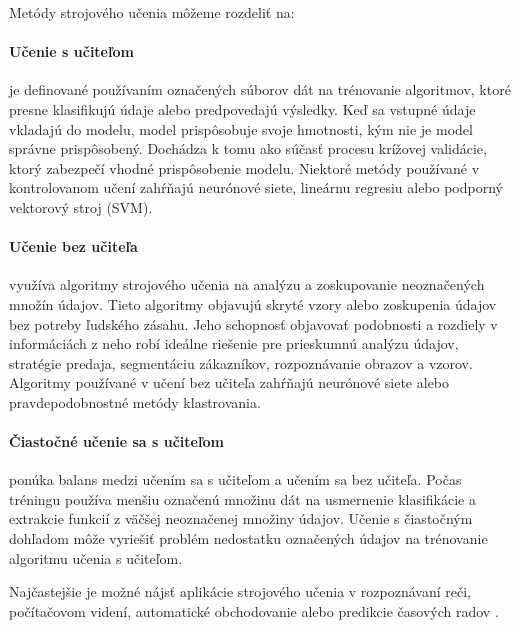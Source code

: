 Metódy strojového učenia môžeme rozdeliť na:
\paragraph{Učenie s učiteľom} je definované používaním označených súborov dát na trénovanie algoritmov, ktoré presne klasifikujú údaje alebo predpovedajú výsledky. Keď sa vstupné údaje vkladajú do modelu, model prispôsobuje svoje hmotnosti, kým nie je model správne prispôsobený. Dochádza k tomu ako súčasť procesu krížovej validácie, ktorý zabezpečí vhodné prispôsobenie modelu. Niektoré metódy používané v kontrolovanom učení zahŕňajú neurónové siete, lineárnu regresiu alebo podporný vektorový stroj (SVM).

\paragraph{Učenie bez učiteľa} využíva algoritmy strojového učenia na analýzu a zoskupovanie neoznačených množín údajov. Tieto algoritmy objavujú skryté vzory alebo zoskupenia údajov bez potreby ľudského zásahu. Jeho schopnosť objavovať podobnosti a rozdiely v informáciách z neho robí ideálne riešenie pre prieskumnú analýzu údajov, stratégie predaja, segmentáciu zákazníkov, rozpoznávanie obrazov a vzorov. Algoritmy používané v učení bez učiteľa zahŕňajú neurónové siete alebo pravdepodobnostné metódy klastrovania.

\paragraph{Čiastočné učenie sa s učiteľom} ponúka balans medzi učením sa s učiteľom a učením sa bez učiteľa. Počas tréningu používa menšiu označenú množinu dát na usmernenie klasifikácie a extrakcie funkcií z väčšej neoznačenej množiny údajov. Učenie s čiastočným dohľadom môže vyriešiť problém nedostatku označených údajov na trénovanie algoritmu učenia s učiteľom.

Najčastejšie je možné nájsť aplikácie strojového učenia v rozpoznávaní reči, počítačovom videní, automatické obchodovanie alebo predikcie časových radov \cite{ai2}.

